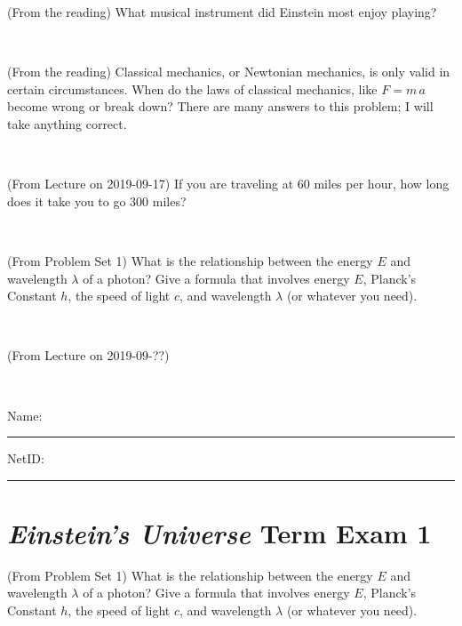 \documentclass[12pt, letterpaper]{article}
\begin{document}
\begin{problem} (From the reading)
What musical instrument did Einstein most enjoy playing?
\end{problem}


\vfill ~


\clearpage


\begin{problem} (From the reading)
Classical mechanics, or Newtonian mechanics, is only valid in certain
circumstances. When do the laws of classical mechanics, like $F =
m\,a$ become wrong or break down? There are many answers to this
problem; I will take anything correct.
\end{problem}


\vfill ~

\begin{problem} (From Lecture on 2019-09-17)
If you are traveling at 60 miles per hour, how long does
it take you to go 300 miles?
\end{problem}


\vfill ~

\begin{problem} (From Problem Set 1)
What is the relationship between the energy $E$ and wavelength
$\lambda$ of a photon? Give a formula that involves energy $E$,
Planck's Constant $h$, the speed of light $c$, and wavelength
$\lambda$ (or whatever you need).
\end{problem}

\vfill ~

\begin{problem} (From Lecture on 2019-09-??)
\end{problem}


\vfill ~


\cleardoublepage



\noindent
Name: \rule[-1ex]{0.60\textwidth}{0.1pt}
NetID: \rule[-1ex]{0.20\textwidth}{0.1pt}

\section*{\textsl{Einstein's Universe} Term Exam 1}
\setcounter{problem}{1}


\begin{problem} (From Problem Set 1)
What is the relationship between the energy $E$ and wavelength
$\lambda$ of a photon? Give a formula that involves energy $E$,
Planck's Constant $h$, the speed of light $c$, and wavelength
$\lambda$ (or whatever you need).
\end{problem}
\end{document}
